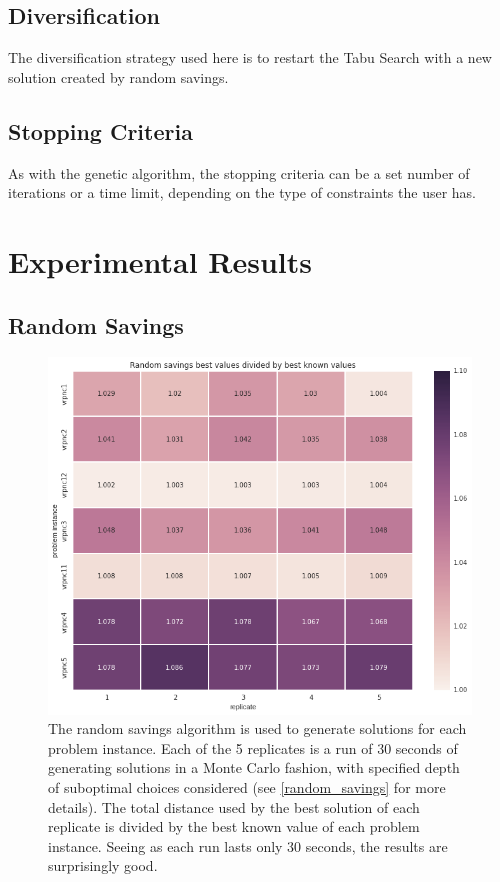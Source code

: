 \documentclass{article} %
\begin{document}
\subsection{Diversification}

The diversification strategy used here is to restart the Tabu Search with a new solution created by random savings.


\subsection{Stopping Criteria}

As with the genetic algorithm, the stopping criteria can be a set number of iterations or a time limit, depending on the type of constraints the user has.


\newpage
\section{Experimental Results}
\label{exp_results}

\subsection{Random Savings}

\begin{figure}[!htb]
\begin{center}
 \includegraphics[scale=0.45]{figures/rs_best}
 \caption{\small The random savings algorithm is used to generate solutions for each problem instance. Each of the 5 replicates is a run of 30 seconds of generating solutions in a Monte Carlo fashion, with specified depth of suboptimal choices considered (see \ref{random_savings} for more details). The total distance used by the best solution of each replicate is divided by the best known value of each problem instance. Seeing as each run lasts only 30 seconds, the results are surprisingly good.}
 \label{rs_fig}
 \end{center}
\end{figure}
\end{document}
